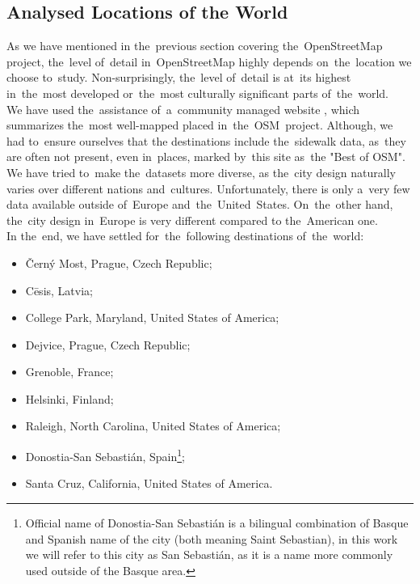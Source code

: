 \subsection{Analysed Locations of the World}
As we have mentioned in the~previous section covering the~OpenStreetMap project, the~level of~detail in~OpenStreetMap highly depends on~the~location we choose to~study. Non-surprisingly, the~level of~detail is at~its highest in~the~most developed or~the~most culturally significant parts of~the~world. \\
We have used the~assistance of~a~community managed website \cite{bestofosm}, which summarizes the~most well-mapped placed in~the~OSM~project. Although, we had to~ensure ourselves that the destinations include the~sidewalk data, as~they are often not present, even in~places, marked by~this site as~the "Best of OSM". \\
We have tried to~make the~datasets more diverse, as the~city design naturally varies over different nations and~cultures. Unfortunately, there is only a~very few data available outside of~Europe and~the~United~States. On~the~other hand, the~city design in~Europe is very different compared to the~American one. \\
In the~end, we have settled for~the~following destinations of~the~world:
\begin{samepage}
\begin{itemize}
    \item Černý Most, Prague, Czech Republic;
    \item Cēsis, Latvia;
    \item College Park, Maryland, United States of America;
    \item Dejvice, Prague, Czech Republic;
    \item Grenoble, France;
    \item Helsinki, Finland;
    \item Raleigh, North Carolina, United States of America;
    \item Donostia-San Sebastián, Spain\footnote{Official name of Donostia-San Sebastián is a bilingual combination of Basque and Spanish name of the city (both meaning Saint Sebastian), in this work we will refer to this city as San Sebastián, as it is a name more commonly used outside of the Basque area.};
    \item Santa Cruz, California, United States of America.
\end{itemize}
\end{samepage}
